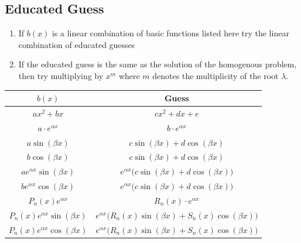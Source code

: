 \documentclass[8pt]{extarticle}
\begin{document}
\begin{multicols*}{3}
  \subsection{Educated Guess}
  \begin{enumerate}[label=(\arabic*)]
    \item If $b(x)$ is a linear combination of basic functions listed
          here try the linear combination of educated guesses
    \item If the educated guess is the same as the solution
          of the homogenous problem, then try multiplying by $x^m$
          where $m$ denotes the multiplicity of the root $\lambda$.
  \end{enumerate}
  \begin{center}
    \begin{tabular}{|c|c|}
      \hline
      $b(x)$                              & Guess                                                                  \\ \hline
      $ax^2 + bx$              & $cx^2 + dx + e$                                                 \\ \hline
      $a \cdot e^{\alpha x}$              & $b \cdot e^{\alpha x}$                                                 \\ \hline
      $a \sin(\beta x)$                   & $c \sin(\beta x) + d \cos(\beta x)$                                    \\ \hline
      $b \cos(\beta x)$                   & $c \sin(\beta x) + d \cos(\beta x)$                                    \\ \hline
      $a e^{\alpha x} \sin(\beta x)$      & $e^{\alpha x} \Big( c \sin(\beta x) + d \cos(\beta x) \Big)$           \\ \hline
      $b e^{\alpha x} \cos(\beta x)$      & $e^{\alpha x} \Big( c \sin(\beta x) + d \cos(\beta x) \Big)$           \\ \hline
      $P_n(x) e^{\alpha x}$               & $R_n(x) \cdot e^{\alpha x}$                                            \\ \hline
      $P_n(x) e^{\alpha x} \sin(\beta x)$ & $e^{\alpha x} \Big( R_n(x) \sin(\beta x) + S_n(x) \cos(\beta x) \Big)$ \\ \hline
      $P_n(x) e^{\alpha x} \cos(\beta x)$ & $e^{\alpha x} \Big( R_n(x) \sin(\beta x) + S_n(x) \cos(\beta x) \Big)$ \\ \hline
    \end{tabular}
  \end{center}


\end{multicols*}
\end{document}
